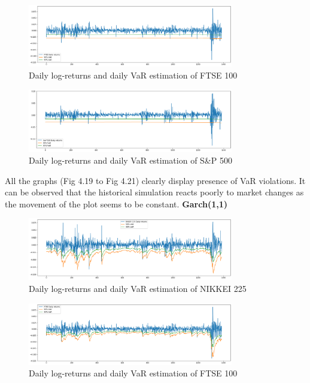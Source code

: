 \documentclass[a4paper,11pt,oneside]{book}
\begin{document}
\begin{figure}[!h]
	\centering
	\includegraphics[width=0.8\textwidth]{figures/HISTF}
	\caption{Daily log-returns and daily VaR estimation of FTSE 100}
	\label{HistF}
\end{figure}

\begin{figure}[!h]
	\centering
	\includegraphics[width=0.8\textwidth]{figures/HISTS}
	\caption{Daily log-returns and daily VaR estimation of S\&P 500}
	\label{HistS}
\end{figure}
All the graphs (Fig 4.19 to Fig 4.21) clearly display presence of VaR violations. It can be observed that the historical simulation reacts poorly to market changes as the movement of the plot seems to be constant.
\newpage
	\textbf{Garch(1,1)}
\begin{figure}[!h]
	\centering
	\includegraphics[width=0.8\textwidth]{figures/GARCHN}
	\caption{Daily log-returns and daily VaR estimation of NIKKEI 225}
	\label{garchN}
\end{figure}

\begin{figure}[!h]
	\centering
	\includegraphics[width=0.8\textwidth]{figures/GARCHF}
	\caption{Daily log-returns and daily VaR estimation of FTSE 100}
	\label{garchF}
\end{figure}
\end{document}
